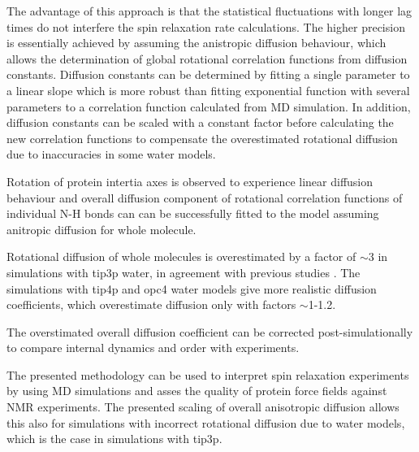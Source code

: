 \documentclass[pre,aps,floatfix,authordate1-4,twocolumn]{revtex4-1}
\begin{document}
The advantage of this approach is that the statistical fluctuations
with longer lag times do not interfere the spin relaxation rate calculations.
The higher precision is essentially achieved by assuming the anistropic
diffusion behaviour, which allows the determination of global rotational
correlation functions from diffusion constants. Diffusion constants
can be determined by fitting a single parameter to a linear slope which is
more robust than fitting exponential function with several parameters to
a correlation function calculated from MD simulation.
In addition, diffusion constants can be scaled with a constant
factor before calculating the new correlation functions to compensate
the overestimated rotational diffusion due to inaccuracies in some
water models.


Rotation of protein intertia axes is observed to experience linear
diffusion behaviour and overall diffusion component of rotational 
correlation functions of individual N-H bonds can can be successfully 
fitted to the model assuming anitropic diffusion for whole molecule.

Rotational diffusion of whole molecules is overestimated by a factor
of $\sim$3 in simulations with tip3p water, in agreement with previous
studies \cite{??}. The simulations with tip4p and opc4 water models
give more realistic diffusion coefficients, which overestimate diffusion
only with factors $\sim$1-1.2. 

The overstimated overall diffusion
coefficient can be corrected post-simulationally to compare internal dynamics
and order with experiments. 

The presented methodology can be used to interpret spin relaxation experiments
by using MD simulations \cite{??} and asses the quality of protein force fields
against NMR experiments. The presented scaling of overall anisotropic diffusion
allows this also for simulations with incorrect rotational diffusion due to water
models, which is the case in simulations with tip3p. 

\begin{acknowledgments}
\end{acknowledgments}


\end{document}
